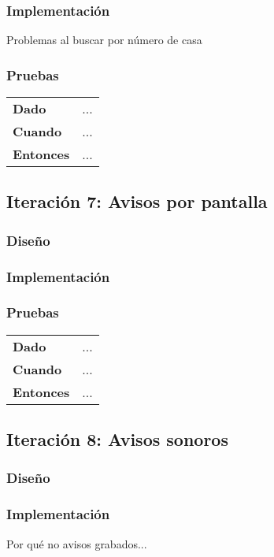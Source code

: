 \subsubsection{Implementación}
Problemas al buscar por número de casa
\subsubsection{Pruebas}
\begin{tabular}{p{}p{}}
  \hline
  \textbf{Dado}     & ... \\
  \textbf{Cuando}   & ... \\
  \textbf{Entonces} & ... \\
  \hline
\end{tabular}

\subsection{Iteración 7: Avisos por pantalla}
\subsubsection{Diseño}
\subsubsection{Implementación}
\subsubsection{Pruebas}
\begin{tabular}{p{}p{}}
  \hline
  \textbf{Dado}     & ... \\
  \textbf{Cuando}   & ... \\
  \textbf{Entonces} & ... \\
  \hline
\end{tabular}

\subsection{Iteración 8: Avisos sonoros}
\subsubsection{Diseño}
\subsubsection{Implementación}
Por qué no avisos grabados...

